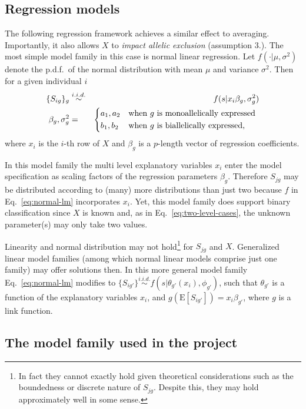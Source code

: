\documentclass[letterpaper]{article}
\begin{document}
\subsection{Regression models}

The following regression framework achieves a similar effect to averaging.
Importantly, it also allows \(X\) to \emph{impact allelic exclusion}
(assumption 3.).  The most simple model family in this case is normal linear
regression.  Let \(f(\cdot|\mu,\sigma^2)\) denote the p.d.f.~of the normal
distribution with mean \(\mu\) and variance \(\sigma^2\).  Then for a given
individual \(i\)
\begin{eqnarray}
\label{eq:normal-lm}
\{S_{ig}\}_g &\overset{i.i.d.}{\sim}& f(s | x_i \beta_g, \sigma^2_g) \\
\label{eq:shared-regression-param}
\beta_g,\sigma^2_g &=&
\begin{dcases*}
a_1, a_2 & when $g$ is monoallelically expressed \\
b_1, b_2 & when $g$ is biallelically expressed,
\end{dcases*}
\end{eqnarray}
where \(x_i\) is the \(i\)-th row of \(X\) and \(\beta_g\) is a \(p\)-length
vector of regression coefficients.

In this model family the multi level explanatory variables \(x_i\) enter the model specification as
scaling factors of the regression parameters \(\beta_g\).  Therefore \(S_{jg}\) may be distributed
according to (many) more distributions than just two because \(f\) in Eq.~\ref{eq:normal-lm}
incorporates \(x_i\).  Yet, this model family does support binary classification since \(X\) is known
and, as in Eq.~\ref{eq:two-level-cases}, the unknown parameter(s) may only take two values.

Linearity and normal distribution may not hold\footnote{In fact they cannot exactly hold given
theoretical considerations such as the boundedness or discrete nature of \(S_{jg}\).  Despite this,
they may hold approximately well in some sense.} for \(S_{jg}\) and \(X\).  Generalized linear model
families (among which normal linear models comprise just one family) may offer solutions then.  In
this more general model family Eq.~\ref{eq:normal-lm} modifies to \(\{S_{ig'}\}
\overset{i.i.d.}{\sim} f(s | \theta_{g'}(x_i), \phi_{g'})\), such that \(\theta_{g'}\) is a function
of the explanatory variables \(x_i\), and \(g(\mathrm{E}[S_{ig'}]) = x_i \beta_{g'}\), where \(g\)
is a link function.

\subsection{The model family used in the project}
\end{document}
